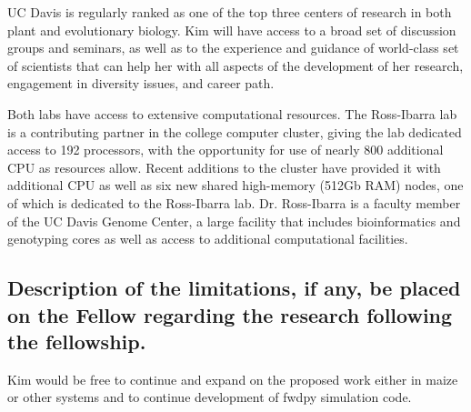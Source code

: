UC Davis is regularly ranked as one of the top three centers of research in both plant and evolutionary biology.  Kim will have access to a broad set of discussion groups and seminars, as well as to the experience and guidance of world-class set of scientists that can help her with all aspects of the development of her research, engagement in diversity issues, and career path.

Both labs have access to extensive computational resources. The Ross-Ibarra lab is a contributing partner in the college  computer cluster, giving the lab dedicated access to 192 processors, with the opportunity for use of nearly 800 additional CPU as resources allow. Recent additions to the cluster have provided it with additional CPU as well as six new shared high-memory (512Gb RAM) nodes, one of which is dedicated to the Ross-Ibarra lab. Dr. Ross-Ibarra is a faculty member of the UC Davis Genome Center, a large facility that includes bioinformatics and genotyping cores as well as access to additional computational facilities. 

\subsection{Description of the limitations, if any, be placed on the Fellow regarding the research following the fellowship.}
Kim would be free to continue and expand on the proposed work either in maize or other systems and to continue development of fwdpy simulation code.
%